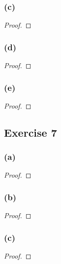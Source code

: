 \documentclass[14pt]{extarticle}
\begin{document}
\subsubsection{(c)}

\begin{proof}

\end{proof}

\subsubsection{(d)}

\begin{proof}

\end{proof}

\subsubsection{(e)}

\begin{proof}

\end{proof}

\subsection{Exercise 7}

\subsubsection{(a)}

\begin{proof}

\end{proof}

\subsubsection{(b)}

\begin{proof}

\end{proof}

\subsubsection{(c)}

\begin{proof}

\end{proof}
\end{document}
